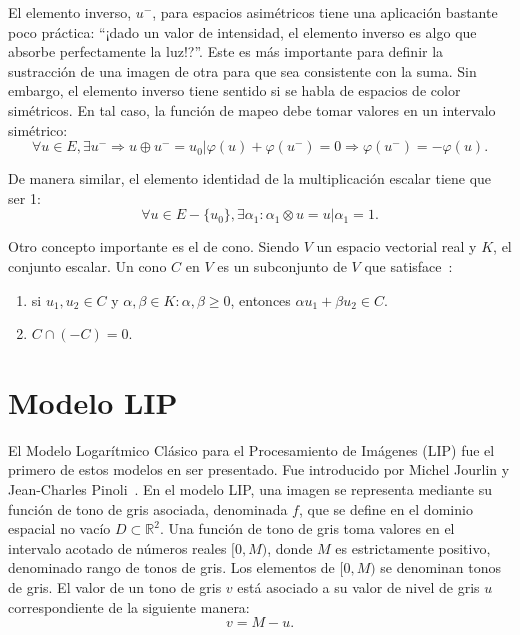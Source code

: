 El elemento inverso, $u^-$, para espacios asimétricos tiene una aplicación bastante poco práctica: ``\textquestiondown¡dado un valor de intensidad, el elemento inverso es algo que absorbe perfectamente la luz!?''. Este es más importante para definir la sustracción de una imagen de otra para que sea consistente con la suma. Sin embargo, el elemento inverso tiene sentido si se habla de espacios de color simétricos. En tal caso, la función de mapeo debe tomar valores en un intervalo simétrico:
\begin{equation}
	\forall u \in E, \exists u^- \Rightarrow u \oplus u^- = u_0 | \varphi(u) + \varphi(u^-) = 0 \Rightarrow \varphi(u^-)=-\varphi(u). 
\end{equation}

De manera similar, el elemento identidad de la multiplicación escalar tiene que ser 1:
\begin{equation}
	\forall u \in E - \{u_0\}, \exists \alpha_1 : \alpha_1 \otimes u = u | \alpha_1 = 1.
\end{equation}

Otro concepto importante es el de cono. Siendo $V$ un espacio vectorial real y $K$, el conjunto escalar. Un cono $C$ en $V$ es un subconjunto de $V$ que satisface~\cite{barker1981theory}:
\begin{enumerate}
	\item si $u_1,u_2\in C$ y $\alpha,\beta\in K:\alpha,\beta\geq0$, entonces $\alpha u_1+\beta u_2\in C$.
	\item $C \cap (-C)={0}$.
\end{enumerate}

\section{Modelo LIP}

El Modelo Logar\'itmico Cl\'asico para el Procesamiento de Im\'agenes (LIP) fue el primero de estos modelos en ser presentado. Fue introducido por Michel Jourlin y Jean-Charles Pinoli~\cite{jourlin1988model}. En el modelo LIP, una imagen se representa mediante su función de tono de gris asociada, denominada $f$, que se define en el dominio espacial no vacío $D \subset \mathbb{R}^2$. Una función de tono de gris toma valores en el intervalo acotado de números reales $[0, M)$, donde $M$ es estrictamente positivo, denominado rango de tonos de gris. Los elementos de $[0, M )$ se denominan tonos de gris. El valor de un tono de gris $v$ est\'a asociado a su valor de nivel de gris $u$ correspondiente de la siguiente manera:
\begin{equation}
	v = M - u.
\end{equation}

